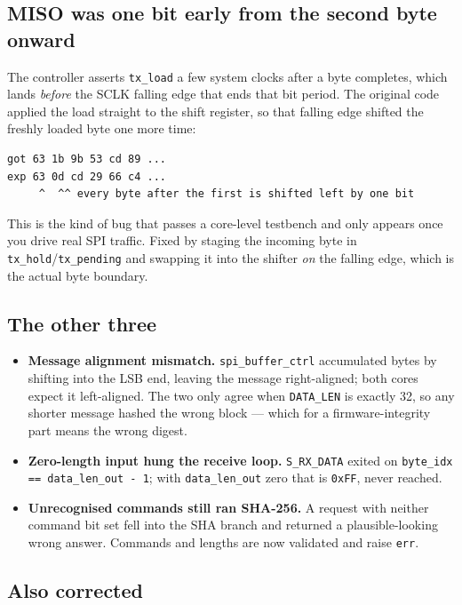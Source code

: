 \documentclass[11pt,a4paper]{article}
\begin{document}
\subsection{MISO was one bit early from the second byte onward}

The controller asserts \texttt{tx\_load} a few system clocks after a byte
completes, which lands \emph{before} the SCLK falling edge that ends that bit
period. The original code applied the load straight to the shift register, so
that falling edge shifted the freshly loaded byte one more time:

{\small
\begin{verbatim}
got 63 1b 9b 53 cd 89 ...
exp 63 0d cd 29 66 c4 ...
     ^  ^^ every byte after the first is shifted left by one bit
\end{verbatim}}

This is the kind of bug that passes a core-level testbench and only appears
once you drive real SPI traffic. Fixed by staging the incoming byte in
\texttt{tx\_hold}/\texttt{tx\_pending} and swapping it into the shifter
\emph{on} the falling edge, which is the actual byte boundary.

\subsection{The other three}

\begin{itemize}[nosep,leftmargin=1.4em]
\item \textbf{Message alignment mismatch.} \texttt{spi\_buffer\_ctrl}
      accumulated bytes by shifting into the LSB end, leaving the message
      right-aligned; both cores expect it left-aligned. The two only agree when
      \texttt{DATA\_LEN} is exactly 32, so any shorter message hashed the wrong
      block --- which for a firmware-integrity part means the wrong digest.
\item \textbf{Zero-length input hung the receive loop.} \texttt{S\_RX\_DATA}
      exited on \texttt{byte\_idx == data\_len\_out - 1}; with
      \texttt{data\_len\_out} zero that is \texttt{0xFF}, never reached.
\item \textbf{Unrecognised commands still ran SHA-256.} A request with neither
      command bit set fell into the SHA branch and returned a
      plausible-looking wrong answer. Commands and lengths are now validated
      and raise \texttt{err}.
\end{itemize}

\subsection{Also corrected}
\end{document}
